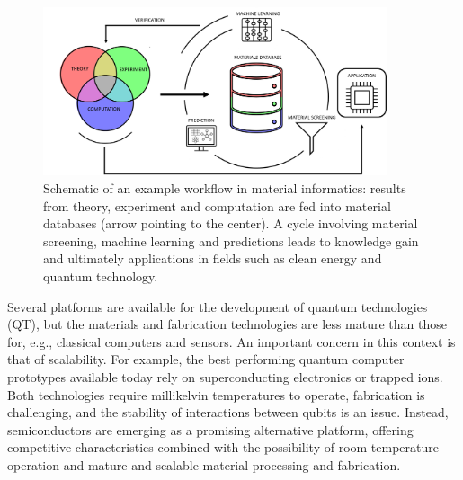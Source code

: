 \documentclass[superscriptaddress,unsortedaddress,
 amsmath,amssymb,
 aps,
]{revtex4-2}
\begin{document}
\begin{figure}[t]
    \centering
    \includegraphics[width=0.9\textwidth]{figures/ht-workflow-new-2.png}
    \caption{Schematic of an example workflow in material informatics: results from theory, experiment and computation are fed into material databases (arrow pointing to the center). A cycle involving material screening, machine learning and predictions leads to knowledge gain and ultimately applications in fields such as clean energy and quantum technology. 
    }
    \label{fig:ht-workflow}
\end{figure}

Several platforms are available for the development of quantum technologies (QT), but the materials and fabrication technologies are less mature than those for, e.g., classical computers and sensors. 
An important concern in this context is that of scalability. 
For example, the best performing quantum computer prototypes available today rely on superconducting electronics or trapped ions. Both technologies require millikelvin temperatures to operate, fabrication is challenging, and the stability of interactions between qubits is an issue. Instead, semiconductors are emerging as a promising alternative platform, offering competitive characteristics combined with the possibility of room temperature operation and mature and scalable material processing and fabrication.  
\end{document}
